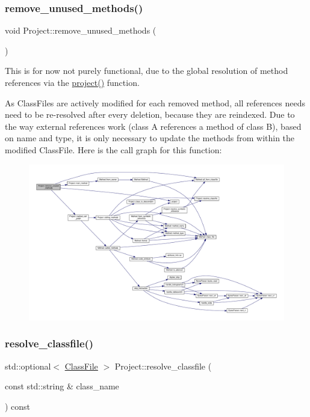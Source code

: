 \subsubsection{\texorpdfstring{remove\+\_\+unused\+\_\+methods()}{remove\_unused\_methods()}}
{\footnotesize\ttfamily void Project\+::remove\+\_\+unused\+\_\+methods (\begin{DoxyParamCaption}{ }\end{DoxyParamCaption})}

This is for now not purely functional, due to the global resolution of method references via the {\ttfamily \hyperlink{project_8cpp_a3c33c839f231786a482d8b5a76c269d3}{project()}} function.

As Class\+Files are actively modified for each removed method, all references needs need to be re-\/resolved after every deletion, because they are reindexed. Due to the way external references work (class A references a method of class B), based on name and type, it is only necessary to update the methods from within the modified Class\+File. Here is the call graph for this function\+:
\nopagebreak
\begin{figure}[H]
\begin{center}
\leavevmode
\includegraphics[width=350pt]{classProject_af5f35c59d1175af1cfa659a597bb6353_cgraph}
\end{center}
\end{figure}
\mbox{\label{classProject_a2ec0981bc841bcbac0ca8072f3b960b5}} 
\subsubsection{\texorpdfstring{resolve\+\_\+classfile()}{resolve\_classfile()}}
{\footnotesize\ttfamily std\+::optional$<$ \hyperlink{classfile_8h_a00b46b60bc40e813e9fb1bb049174346}{Class\+File} $>$ Project\+::resolve\+\_\+classfile (\begin{DoxyParamCaption}\item[{const std\+::string \&}]{class\+\_\+name }\end{DoxyParamCaption}) const}



